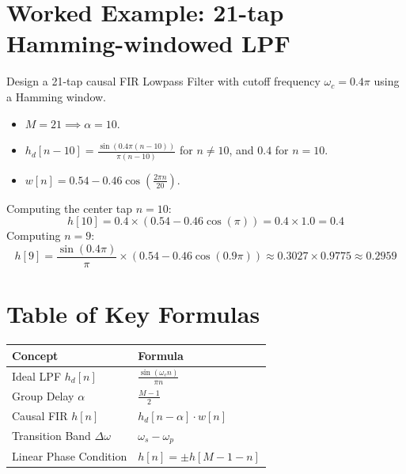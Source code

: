 \documentclass[11pt,a4paper]{article}
\begin{document}
\section{Worked Example: 21-tap Hamming-windowed LPF}
Design a 21-tap causal FIR Lowpass Filter with cutoff frequency $\omega_c = 0.4\pi$ using a Hamming window.
\begin{itemize}
    \item $M = 21 \implies \alpha = 10$.
    \item $h_d[n-10] = \frac{\sin(0.4\pi (n-10))}{\pi (n-10)}$ for $n \ne 10$, and $0.4$ for $n=10$.
    \item $w[n] = 0.54 - 0.46 \cos\left(\frac{2\pi n}{20}\right)$.
\end{itemize}
Computing the center tap $n=10$:
\begin{equation}
h[10] = 0.4 \times \left(0.54 - 0.46 \cos(\pi)\right) = 0.4 \times 1.0 = 0.4
\end{equation}
Computing $n=9$:
\begin{equation}
h[9] = \frac{\sin(0.4\pi)}{\pi} \times \left(0.54 - 0.46 \cos(0.9\pi)\right) \approx 0.3027 \times 0.9775 \approx 0.2959
\end{equation}

\section{Table of Key Formulas}
\begin{table}[H]
\centering
\begin{tabular}{@{}ll@{}}
\toprule
\textbf{Concept} & \textbf{Formula} \\
\midrule
Ideal LPF $h_d[n]$ & $\frac{\sin(\omega_c n)}{\pi n}$ \\
Group Delay $\alpha$ & $\frac{M-1}{2}$ \\
Causal FIR $h[n]$ & $h_d[n-\alpha] \cdot w[n]$ \\
Transition Band $\Delta\omega$ & $\omega_s - \omega_p$ \\
Linear Phase Condition & $h[n] = \pm h[M-1-n]$ \\
\bottomrule
\end{tabular}
\end{table}
\end{document}
